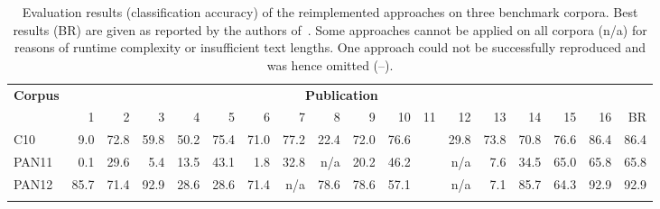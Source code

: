 \begin{table*}[tb]%
\fontsize{8pt}{9pt}\selectfont%
\centering%
\renewcommand{\arraystretch}{0.9}%
\renewcommand{\tabcolsep}{3pt}%
\caption{Evaluation results (classification accuracy) of the reimplemented approaches on three benchmark corpora. Best results (BR) are given as reported by the authors of~\cite{argamon:2011,escalante:2011,juola:2012}. Some approaches cannot be applied on all corpora (n/a) for reasons of runtime complexity or insufficient text lengths. One approach could not be successfully reproduced and was hence omitted (--).}%
\label{table-evaluation-results}%
\vspace{2ex}%
\begin{tabular}{@{}lrrrrrrrrrrrrrrrrr@{}}
\addlinespace[-4pt]
\toprule
{\bfseries Corpus} & \multicolumn{16}{c}{\bfseries Publication} \\
      &   1  &   2  &   3  &   4  &   5  &   6  &   7  &   8  &   9  &  10  &  11  &  12  &  13  &  14  &  15  &  16  &  BR  \\
\midrule
C10   &  9.0 & 72.8 & 59.8 & 50.2 & 75.4 & 71.0 & 77.2 & 22.4 & 72.0 & 76.6 &      & 29.8 & 73.8 & 70.8 & 76.6 & 86.4 & 86.4 \\
PAN11 &  0.1 & 29.6 &  5.4 & 13.5 & 43.1 &  1.8 & 32.8 &  n/a & 20.2 & 46.2 &      &  n/a &  7.6 & 34.5 & 65.0 & 65.8 & 65.8 \\
PAN12 & 85.7 & 71.4 & 92.9 & 28.6 & 28.6 & 71.4 &  n/a & 78.6 & 78.6 & 57.1 &      &  n/a &  7.1 & 85.7 & 64.3 & 92.9 & 92.9 \\
\bottomrule
\addlinespace
\end{tabular}%
\end{table*}
